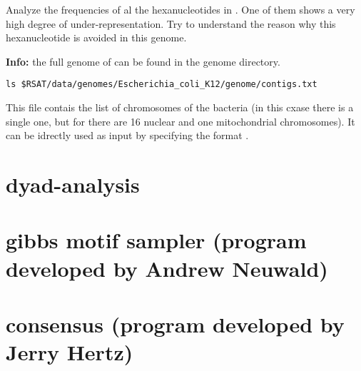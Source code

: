 \begin{exercise}

  Analyze the frequencies of al the hexanucleotides in
  . One of them shows a very high degree of
  under-representation. Try to understand the reason why this
  hexanucleotide is avoided in this genome.

  \textbf{Info:} the full genome of  can be
  found in the \RSAT genome directory.

{\color{Blue} \begin{footnotesize} 
\begin{verbatim}
ls $RSAT/data/genomes/Escherichia_coli_K12/genome/contigs.txt
\end{verbatim} \end{footnotesize}
}

This file contais the list of chromosomes of the bacteria (in this
cxase there is a single one, but for  there are 16 nuclear
and one mitochondrial chromosomes). It can be idrectly used as input
by specifying the format .

\end{exercise}



\section{dyad-analysis}

\tbw


\section{gibbs motif sampler (program developed by Andrew Neuwald)}




\section{consensus (program developed by Jerry Hertz)}

